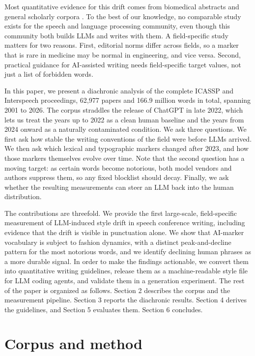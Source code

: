 \documentclass[a4paper,10pt,twocolumn]{article}
\begin{document}
Most quantitative evidence for this drift comes from biomedical abstracts and general scholarly corpora \cite{kobak2024,gray2024,juzek2025}. To the best of our knowledge, no comparable study exists for the speech and language processing community, even though this community both builds LLMs and writes with them. A field-specific study matters for two reasons. First, editorial norms differ across fields, so a marker that is rare in medicine may be normal in engineering, and vice versa. Second, practical guidance for AI-assisted writing needs field-specific target values, not just a list of forbidden words.

In this paper, we present a diachronic analysis of the complete ICASSP and Interspeech proceedings, 62{,}977 papers and 166.9 million words in total, spanning 2001 to 2026. The corpus straddles the release of ChatGPT in late 2022, which lets us treat the years up to 2022 as a clean human baseline and the years from 2024 onward as a naturally contaminated condition. We ask three questions. We first ask how stable the writing conventions of the field were before LLMs arrived. We then ask which lexical and typographic markers changed after 2023, and how those markers themselves evolve over time. Note that the second question has a moving target: as certain words become notorious, both model vendors and authors suppress them, so any fixed blocklist should decay. Finally, we ask whether the resulting measurements can steer an LLM back into the human distribution.

The contributions are threefold. We provide the first large-scale, field-specific measurement of LLM-induced style drift in speech conference writing, including evidence that the drift is visible in punctuation alone. We show that AI-marker vocabulary is subject to fashion dynamics, with a distinct peak-and-decline pattern for the most notorious words, and we identify declining human phrases as a more durable signal. In order to make the findings actionable, we convert them into quantitative writing guidelines, release them as a machine-readable style file for LLM coding agents, and validate them in a generation experiment. The rest of the paper is organized as follows. Section 2 describes the corpus and the measurement pipeline. Section 3 reports the diachronic results. Section 4 derives the guidelines, and Section 5 evaluates them. Section 6 concludes.

\section{Corpus and method}
\end{document}
